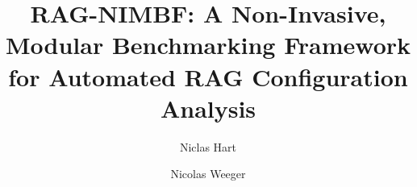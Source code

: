 \documentclass[runningheads]{llncs}
\title{RAG-NIMBF: A Non-Invasive, Modular Benchmarking Framework for Automated RAG Configuration Analysis}
\author{Niclas Hart\inst{1} \and Nicolas Weeger\inst{1}}
\institute{Ansbach University of Applied Sciences}
\begin{document}
\sloppy
%
\maketitle
%








%

%
{\footnotesize
\setlength{\parskip}{0pt}
\renewcommand{\baselinestretch}{0.95}\selectfont


}
%
\end{document}
